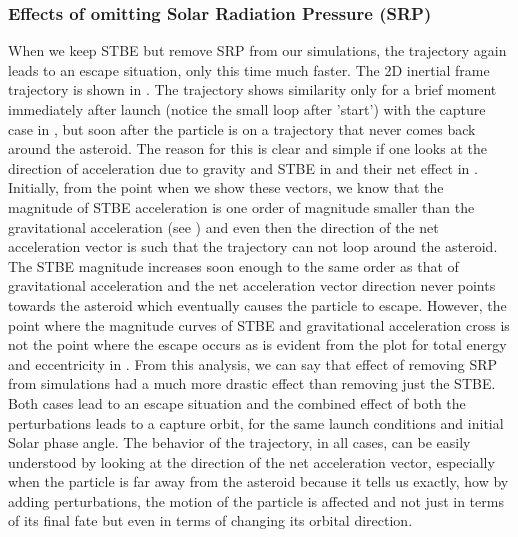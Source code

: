 \subsubsection{Effects of omitting Solar Radiation Pressure (SRP)}
When we keep \gls{STBE} but remove \gls{SRP} from our simulations, the trajectory again leads to an escape situation, only this time much faster. The 2D inertial frame trajectory is shown in . The trajectory shows similarity only for a brief moment immediately after launch (notice the small loop after 'start') with the capture case in , but soon after the particle is on a trajectory that never comes back around the asteroid. The reason for this is clear and simple if one looks at the direction of acceleration due to gravity and \gls{STBE} in  and their net effect in . Initially, from the point when we show these vectors, we know that the magnitude of \gls{STBE} acceleration is one order of magnitude smaller than the gravitational acceleration (see ) and even then the direction of the net acceleration vector is such that the trajectory can not loop around the asteroid. The \gls{STBE} magnitude increases soon enough to the same order as that of gravitational acceleration and the net acceleration vector direction never points towards the asteroid which eventually causes the particle to escape. However, the point where the magnitude curves of \gls{STBE} and gravitational acceleration cross is not the point where the escape occurs as is evident from the plot for total energy and eccentricity in .
%
\newline\newline
%
From this analysis, we can say that effect of removing \gls{SRP} from simulations had a much more drastic effect than removing just the \gls{STBE}. Both cases lead to an escape situation and the combined effect of both the perturbations leads to a capture orbit, for the same launch conditions and initial Solar phase angle. The behavior of the trajectory, in all cases, can be easily understood by looking at the direction of the net acceleration vector, especially when the particle is far away from the asteroid because it tells us exactly, how by adding perturbations, the motion of the particle is affected and not just in terms of its final fate but even in terms of changing its orbital direction.

